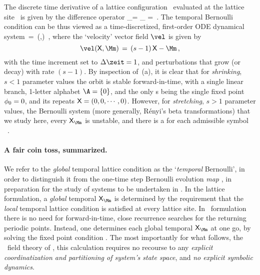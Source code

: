 The discrete time derivative of a lattice configuration \Xx\ evaluated at the
lattice site \zeit\ is given by the {difference operator}
\beq
\dot{\ssp}_\zeit =
\left[\frac{\partial\Xx}{\partial\zeit}\right]_\zeit
        =
\,.
The {temporal Bernoulli} condition  %
can be thus viewed as a time-discretized, first-order ODE dynamical
system
\beq
   \dot{\Xx} \,=\, \vel(\Xx,\Mm) \,,
where the `velocity' vector field $\vel$ is given by
\[
\vel(\Xx,\Mm) \,=\,
(s-1)\,\Xx-\Mm
\,,
\]
with the time increment set to $\Delta\zeit=1$, and perturbations that
grow (or decay) with rate $({s}-1)$. By inspection of
\,(a), it is clear that for \emph{shrinking},
${s}<1$  parameter values the orbit is stable for\-ward-in-time, with a
single linear branch, 1-letter alphabet $\A=\{0\}$, and the only
{\lattstate}s being the single fixed point  $\phi_0=0$, and its repeats
$\mathsf{X}=(0,0,\cdots,0)$. However, for \emph{stretching},  ${s}>1$  parameter
values, the Bernoulli system (more generally, R{\'e}nyi's beta
transformations) that we study here, every {\lattstate}
$\Xx_\Mm$ is unstable, and there is a {\lattstate} for each admissible
symbol \brick\ \Mm.

\paragraph{A fair coin toss, summarized.}
We refer to the \emph{global} temporal lattice condition 
as the `\emph{temporal} Bernoulli', in order to distinguish it from the
one-time step Bernoulli evolution \emph{map} , in
preparation for the study of \emph{\spt} systems to be undertaken in
. In the lattice formulation, a \emph{global} {temporal
{\lattstate}} $\Xx_\Mm$ is determined by the requirement that the
\emph{local} temporal lattice condition  is satisfied
at every lattice site. In \spt\ formulation there is no need for
for\-ward-in-time, close recurrence searches for the returning periodic
points. Instead, one determines each global {temporal {\lattstate}}
$\Xx_\Mm$ at one go, by solving the fixed point condition
. The most importantly for what follows, the \spt\
field theory of , this calculation requires no recourse to any
\emph{explicit coordinatization and partitioning of system's state
space}, and \emph{no explicit symbolic dynamics}.

